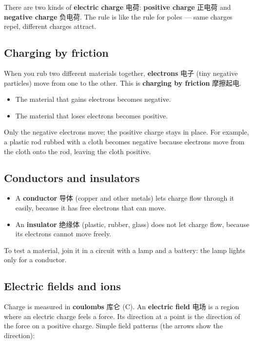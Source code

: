 \documentclass[11pt]{article}
\begin{document}
There are two kinds of \textbf{electric charge} 电荷: \textbf{positive charge} 正电荷 and \textbf{negative charge} 负电荷. The rule is like the rule for poles — same charges repel, different charges attract.

\subsection*{Charging by friction}

When you rub two different materials together, \textbf{electrons} 电子 (tiny negative particles) move from one to the other. This is \textbf{charging by friction} 摩擦起电.

\begin{itemize}
\item The material that gains electrons becomes negative.

\item The material that loses electrons becomes positive.

\end{itemize}

Only the negative electrons move; the positive charge stays in place. For example, a plastic rod rubbed with a cloth becomes negative because electrons move from the cloth onto the rod, leaving the cloth positive.

\subsection*{Conductors and insulators}

\begin{itemize}
\item A \textbf{conductor} 导体 (copper and other metals) lets charge flow through it easily, because it has free electrons that can move.

\item An \textbf{insulator} 绝缘体 (plastic, rubber, glass) does not let charge flow, because its electrons cannot move freely.

\end{itemize}

To test a material, join it in a circuit with a lamp and a battery: the lamp lights only for a conductor.

\subsection*{Electric fields and ions}

Charge is measured in \textbf{coulombs} 库仑 (C). An \textbf{electric field} 电场 is a region where an electric charge feels a force. Its direction at a point is the direction of the force on a positive charge. Simple field patterns (the arrows show the direction):
\end{document}
